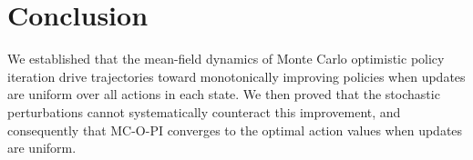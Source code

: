 







\section{Conclusion}




We established that the mean-field dynamics of Monte Carlo optimistic policy iteration drive trajectories toward monotonically improving policies when updates are uniform over all actions in each state. 
We then proved that the stochastic perturbations cannot systematically counteract this improvement,
and consequently that MC-O-PI converges to the optimal action values when updates are uniform.


